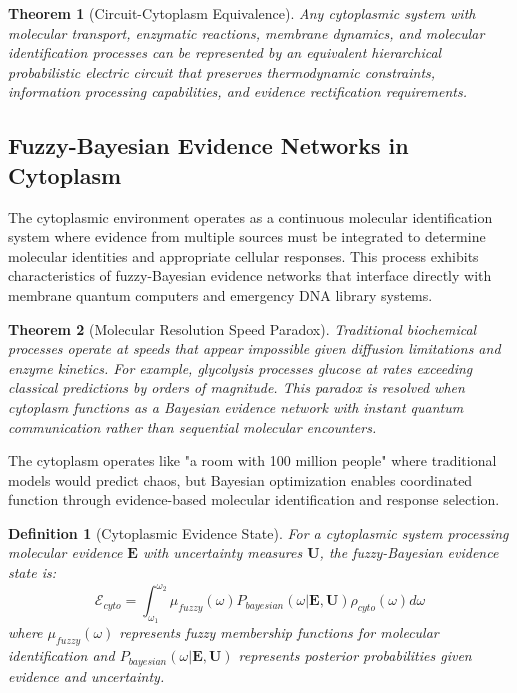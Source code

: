 \documentclass[12pt,a4paper]{article}
\newtheorem{theorem}{Theorem}
\newtheorem{definition}{Definition}
\begin{document}
\begin{theorem}[Circuit-Cytoplasm Equivalence]
Any cytoplasmic system with molecular transport, enzymatic reactions, membrane dynamics, and molecular identification processes can be represented by an equivalent hierarchical probabilistic electric circuit that preserves thermodynamic constraints, information processing capabilities, and evidence rectification requirements.
\end{theorem}

\subsection{Fuzzy-Bayesian Evidence Networks in Cytoplasm}

The cytoplasmic environment operates as a continuous molecular identification system where evidence from multiple sources must be integrated to determine molecular identities and appropriate cellular responses. This process exhibits characteristics of fuzzy-Bayesian evidence networks that interface directly with membrane quantum computers and emergency DNA library systems.

\begin{theorem}[Molecular Resolution Speed Paradox]
Traditional biochemical processes operate at speeds that appear impossible given diffusion limitations and enzyme kinetics. For example, glycolysis processes glucose at rates exceeding classical predictions by orders of magnitude. This paradox is resolved when cytoplasm functions as a Bayesian evidence network with instant quantum communication rather than sequential molecular encounters.
\end{theorem}

The cytoplasm operates like "a room with 100 million people" where traditional models would predict chaos, but Bayesian optimization enables coordinated function through evidence-based molecular identification and response selection.

\begin{definition}[Cytoplasmic Evidence State]
For a cytoplasmic system processing molecular evidence $\mathbf{E}$ with uncertainty measures $\mathbf{U}$, the fuzzy-Bayesian evidence state is:
\begin{equation}
\mathcal{E}_{cyto} = \int_{\omega_1}^{\omega_2} \mu_{fuzzy}(\omega) P_{bayesian}(\omega | \mathbf{E}, \mathbf{U}) \rho_{cyto}(\omega) d\omega
\end{equation}
where $\mu_{fuzzy}(\omega)$ represents fuzzy membership functions for molecular identification and $P_{bayesian}(\omega | \mathbf{E}, \mathbf{U})$ represents posterior probabilities given evidence and uncertainty.
\end{definition}
\end{document}
